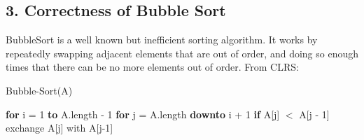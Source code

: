 \documentclass[12pt]{article}
\begin{document}
\subsection*{3. Correctness of Bubble Sort}
BubbleSort is a well known but inefficient sorting algorithm. It works by repeatedly swapping adjacent elements that are out of order, and doing so enough times that there can be no more elements out of order. From CLRS: \\
\begin{algorithm}
\caption{Bubble-Sort(A)}
\begin{algorithmic}[1]
\State \textbf{for} i = 1 \textbf{to} A.length - 1
\State \qquad \textbf{for} j = A.length \textbf{downto} i + 1
\State \qquad \qquad \textbf{if} A[j] $<$ A[j - 1]
\State \qquad \qquad \qquad exchange A[j] with A[j-1]
\end{algorithmic}
\end{algorithm}
\end{document}
